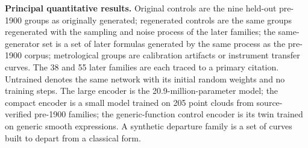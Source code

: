 \documentclass{article}
\begin{document}
\begin{table}[htbp]
\centering
\caption{\textbf{Principal quantitative results.} Original controls are the nine held-out pre-1900 groups as originally generated; regenerated controls are the same
groups regenerated with the sampling and noise process of the later families;
the same-generator set is a set of later formulas generated by the same process
as the pre-1900 corpus; metrological groups are calibration artifacts or
instrument transfer curves. The 38 and 55 later families are each traced to a
primary citation. Untrained denotes the same network with its initial random weights and no training steps. The large encoder is the 20.9-million-parameter model; the compact encoder is a small model trained on 205 point clouds from source-verified pre-1900 families; the generic-function control encoder is its twin trained on generic smooth expressions. A synthetic departure family is a set of curves built to depart from a classical form.}
\label{stab:principal}
\small


\end{table}
\end{document}
